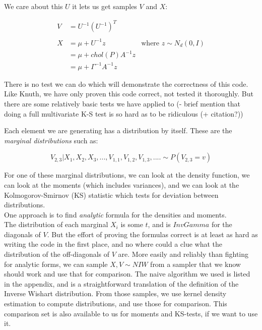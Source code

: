 \documentclass[english]{report}
\begin{document}
We care about this $U$ it lets us get samples $V$ and $X$:

\begin{align*}
V & =U^{-1}\left(U^{-1}\right)^{T}\\
\\
X & =\mu+U^{-1}z & \text{where }z\sim N_{d}(0,I)\\
 & =\mu+chol(P)A^{-1}z\\
 & =\mu+\Gamma^{-1}A^{-1}z
\end{align*}




There is no test we can do which will demonstrate the correctness of this code.
Like Knuth, we have only proven this code correct, not tested it thoroughly.
But there are some relatively basic tests we have applied to 
(- brief mention that doing a full multivariate K-S test is so hard as to be ridiculous (+ citation?))

Each element we are generating has a distribution by itself. These are the \emph{marginal distributions} such as:

$$ V_{2,3} | X_1, X_2, X_3, ..., V_{1,1}, V_{1,2}, V_{1,3} , ....  \sim P(V_{2,3} = v) $$

For one of these marginal distributions, we can look at the density function, we can look at the moments (which includes variances), and we can look at the Kolmogorov-Smirnov (KS) statistic which tests for deviation between distributions.\\

One approach is to find \emph{analytic} formula for the densities and moments.\\

The distribution of each marginal $X_i$ is \cite{???} some $t$, and is $InvGamma$ \cite{Wikipedia2} for the diagonals of $V$. But the effort of proving the formulas correct is at least as hard as writing the code in the first place, and no where could a clue what the distribution of the off-diagonals of $V$ are. More easily and reliably than fighting for analytic forms, we can sample $X,V \sim NIW$ from a sampler that we know should work and use that for comparison.
The naive algorithm we used is listed in the appendix, and is a straightforward translation of the definition of the Inverse Wishart distribution.
From those samples, we use kernel density estimation to compute distributions, and use those for comparison. This comparison set is also available to us for moments and KS-tests, if we want to use it.
\end{document}
